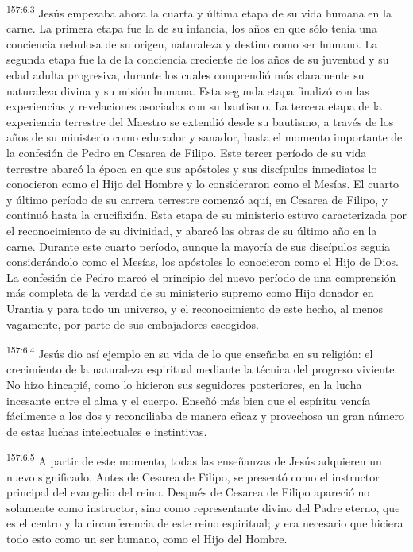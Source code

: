 \par
\textsuperscript{157:6.3} Jesús empezaba ahora la cuarta y última etapa de su vida humana en la carne. La primera etapa fue la de su infancia, los años en que sólo tenía una conciencia nebulosa de su origen, naturaleza y destino como ser humano. La segunda etapa fue la de la conciencia creciente de los años de su juventud y su edad adulta progresiva, durante los cuales comprendió más claramente su naturaleza divina y su misión humana. Esta segunda etapa finalizó con las experiencias y revelaciones asociadas con su bautismo. La tercera etapa de la experiencia terrestre del Maestro se extendió desde su bautismo, a través de los años de su ministerio como educador y sanador, hasta el momento importante de la confesión de Pedro en Cesarea de Filipo. Este tercer período de su vida terrestre abarcó la época en que sus apóstoles y sus discípulos inmediatos lo conocieron como el Hijo del Hombre y lo consideraron como el Mesías. El cuarto y último período de su carrera terrestre comenzó aquí, en Cesarea de Filipo, y continuó hasta la crucifixión. Esta etapa de su ministerio estuvo caracterizada por el reconocimiento de su divinidad, y abarcó las obras de su último año en la carne. Durante este cuarto período, aunque la mayoría de sus discípulos seguía considerándolo como el Mesías, los apóstoles lo conocieron como el Hijo de Dios. La confesión de Pedro marcó el principio del nuevo período de una comprensión más completa de la verdad de su ministerio supremo como Hijo donador en Urantia y para todo un universo, y el reconocimiento de este hecho, al menos vagamente, por parte de sus embajadores escogidos.

\par
\textsuperscript{157:6.4} Jesús dio así ejemplo en su vida de lo que enseñaba en su religión: el crecimiento de la naturaleza espiritual mediante la técnica del progreso viviente. No hizo hincapié, como lo hicieron sus seguidores posteriores, en la lucha incesante entre el alma y el cuerpo. Enseñó más bien que el espíritu vencía fácilmente a los dos y reconciliaba de manera eficaz y provechosa un gran número de estas luchas intelectuales e instintivas.

\par
\textsuperscript{157:6.5} A partir de este momento, todas las enseñanzas de Jesús adquieren un nuevo significado. Antes de Cesarea de Filipo, se presentó como el instructor principal del evangelio del reino. Después de Cesarea de Filipo apareció no solamente como instructor, sino como representante divino del Padre eterno, que es el centro y la circunferencia de este reino espiritual; y era necesario que hiciera todo esto como un ser humano, como el Hijo del Hombre.

